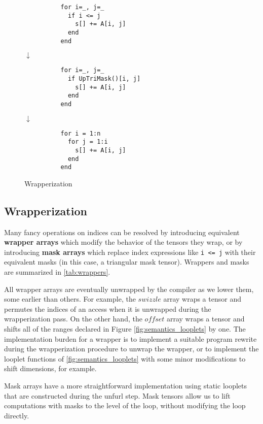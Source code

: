     \begin{wrapfigure}{r}{0.17\textwidth}
        \vspace{-14pt}
        \begin{verbatim}
          for i=_, j=_
            if i <= j
              s[] += A[i, j]
            end
          end
        \end{verbatim}
        $\downarrow$
        \begin{verbatim}
          for i=_, j=_
            if UpTriMask()[i, j]
              s[] += A[i, j]
            end
          end
        \end{verbatim}
        $\downarrow$
        \begin{verbatim}
          for i = 1:n
            for j = 1:i
              s[] += A[i, j]
            end
          end
        \end{verbatim}
        \caption{Wrapperization}\label{fig:wrapperization}
    \end{wrapfigure}
\subsection{Wrapperization}

    Many fancy operations on indices can be resolved by introducing equivalent
    \textbf{wrapper arrays} which modify the behavior of the tensors they wrap,
    or by introducing \textbf{mask arrays} which replace index expressions like
    \texttt{i <= j} with their equivalent masks (in this case, a
    triangular mask tensor).  Wrappers and masks are summarized in \ref{tab:wrappers}.

    All wrapper arrays are eventually unwrapped by the compiler as we lower
    them, some earlier than others. For example, the $swizzle$ array wraps a
    tensor and permutes the indices of an access when it is unwrapped during the
    wrapperization pass. On the other hand, the $offset$ array wraps a tensor
    and shifts all of the ranges declared in Figure \ref{fig:semantics_looplets} by one.
    The implementation burden for a wrapper is to implement a suitable
    program rewrite during the wrapperization procedure to unwrap the wrapper, or to 
    implement the looplet functions of \ref{fig:semantics_looplets} with some minor modifications
    to shift dimensions, for example.

    Mask arrays have a more straightforward implementation using static looplets
    that are constructed during the unfurl step. Mask tensors
    allow us to lift computations with masks to the level of the loop, without modifying the loop directly.

